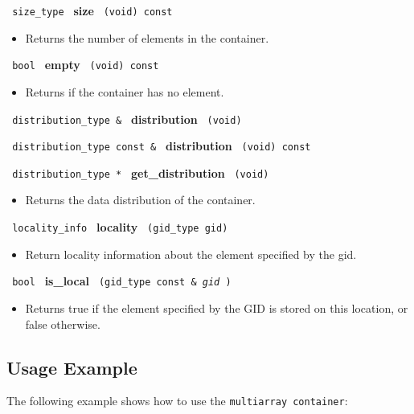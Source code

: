 \noindent
\texttt{%
size\_type
}
\textbf{size}%
\texttt{%
(void) const
}

\begin{itemize}
\item
Returns the number of elements in the container. 
\end{itemize}
 
\noindent
\texttt{%
bool
}
\textbf{empty}%
\texttt{%
(void) const
}

\begin{itemize}
\item
Returns if the container has no element.
\end{itemize}
 
\noindent
\texttt{%
distribution\_type \& 
}
\textbf{distribution}%
\texttt{%
 (void)
}
 
\noindent
\texttt{%
distribution\_type const \& 
}
\textbf{distribution}%
\texttt{%
 (void) const
}
 
\noindent
\texttt{%
distribution\_type *
}
\textbf{get\_distribution}%
\texttt{%
(void)
}
 
\begin{itemize}
\item
Returns the data distribution of the container.
\end{itemize}

\noindent
\texttt{%
locality\_info 
}
\textbf{locality}%
\texttt{%
 (gid\_type gid)
}

\begin{itemize}
\item
Return locality information about the element specified by the gid. 
\end{itemize}
 
\noindent
\texttt{%
bool
}
\textbf{is\_local}%
\texttt{%
(gid\_type const \&
\textit{gid}%
)
}

\begin{itemize}
\item
Returns true if the element specified by the GID is stored on this location, or false otherwise. 
\end{itemize}


\subsection{Usage Example} \label{sec-multi-cont-use}

The following example shows how to use the \texttt{multiarray container}:


